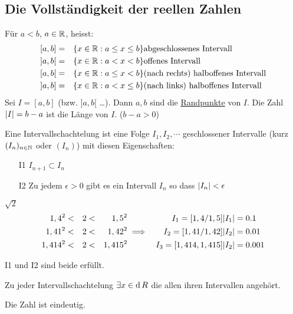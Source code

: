 \subsection{Die Vollständigkeit der reellen Zahlen}
Für $a<b$, $a\in\mathbb{R}$, heisst:
\begin{align*}
  \left[ a,b \right]&=&\left\{ x\in\mathbb{R}: a\leq x\leq b \right\} & \text{abgeschlossenes Intervall}\\
  \left] a,b \right[&=&\left\{ x\in\mathbb{R}: a< x< b \right\} & \text{offenes Intervall}\\
  \left[ a,b \right[&=&\left\{ x\in\mathbb{R}: a\leq x< b \right\} & \text{(nach rechts) halboffenes Intervall}\\
  \left] a,b \right]&=&\left\{ x\in\mathbb{R}: a< x\leq b \right\} & \text{(nach links) halboffenes Intervall}\\
\end{align*}
Sei $I=[a,b]$ (bzw. $]a,b[$ \ldots). Dann $a,b$ sind die \underline{Randpunkte} von $I$. Die Zahl $\mathopen| I \mathclose|=b-a$ ist die Länge von $I$. ($b-a>0$)
\begin{Def}
  Eine Intervallschachtelung ist eine Folge $I_1, I_2,\cdots$ geschlossener Intervalle (kurz $(I_n)_{n\in\mathbb{N}}$ oder $(I_n)$) mit diesen Eigenschaften:
  \begin{itemize}
    \item[I1] $I_{n+1}\subset I_n$
    \item[I2] Zu jedem $\epsilon >0$ gibt es ein Intervall $I_n$ so dass $\mathopen| I_n \mathclose| < \epsilon$
  \end{itemize}
\end{Def}
\begin{Bsp}
  $\sqrt{2}$
  \begin{align*}
    1,4^2 & < & 2 & < & 1,5^2 & & I_1 = \left[ 1,4 / 1,5 \right] & \mathopen| I_1 \mathclose| = 0.1\\
    1,41^2 & < & 2 & < & 1,42^2 & \implies & I_2 = \left[ 1,41 / 1,42 \right] & \mathopen| I_2 \mathclose| = 0.01\\
    1,414^2 & < & 2 & < & 1,415^2 & & I_3 = \left[ 1,414, 1,415 \right] & \mathopen| I_2 \mathclose| = 0.001 
  \end{align*}
\end{Bsp}
\begin{Bew}
  I1 und I2 sind beide erfüllt.
\end{Bew}
\begin{Axi}
  Zu jeder Intervallschachtelung $\exists x\in\operatorname{d}{R}$ die allen ihren Intervallen angehört.
\end{Axi}
\begin{Sat}
  Die Zahl ist eindeutig.
\end{Sat}
